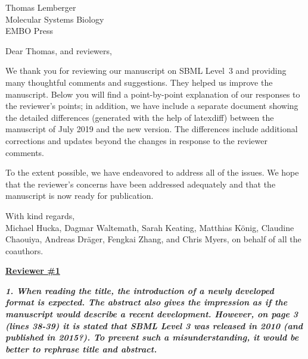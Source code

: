 \documentclass[11pt]{mhletter}
\begin{document}
\thispagestyle{empty}


\hspace{4in}%

\vspace*{2ex}

\begin{flushleft}
Thomas Lemberger\\
Molecular Systems Biology\\
EMBO Press
\end{flushleft}

\setlength{\parskip}{0.7em}

Dear Thomas, and reviewers,

We thank you for reviewing our manuscript on SBML Level~3 and providing many thoughtful comments and suggestions.  They helped us improve the manuscript.  Below you will find a point-by-point explanation of our responses to the reviewer's points; in addition, we have include a separate document showing the detailed differences (generated with the help of latexdiff) between the manuscript of July 2019 and the new version.  The differences include additional corrections and updates beyond the changes in response to the reviewer comments.

To the extent possible, we have endeavored to address all of the issues.  We hope that the reviewer's concerns have been addressed adequately and that the manuscript is now ready for publication.


With kind regards,\\
Michael Hucka, Dagmar Waltemath, Sarah Keating, Matthias K\"{o}nig, Claudine Chaouiya, Andreas Dr\"{a}ger, Fengkai Zhang, and Chris Myers, on behalf of all the coauthors.

\vspace*{2em}

\textbf{\underline{Reviewer \#1}}

\textbf{\textit{1. When reading the title, the introduction of a newly developed format is expected. The abstract also gives the impression as if the manuscript would describe a recent development. However, on page 3 (lines 38-39) it is stated that SBML Level 3 was released in 2010 (and published in 2015?). To prevent such a misunderstanding, it would be better to rephrase title and abstract.}}
\end{document}
